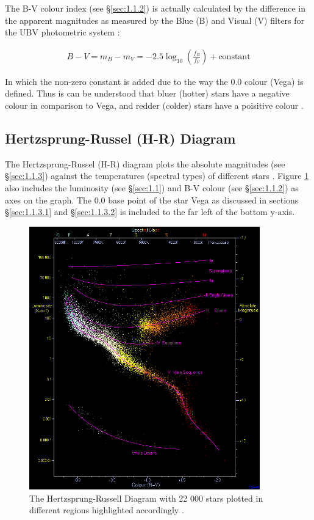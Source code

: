 \documentclass[12pt]{article}
\begin{document}
The B-V colour index (see §\ref{sec:1.1.2}) is actually calculated by the difference in the apparent magnitudes as measured by the Blue (B) and Visual (V) filters
for the UBV photometric system \cite{ccds}:

\vspace{-1.5ex}
\begin{gather} \label{eq:4}
    B-V = m_B - m_V = -2.5 \log_{10}\left( \frac{f_B}{f_V} \right) + \text{constant}
\end{gather}

In which the non-zero constant is added due to the way the 0.0 colour (Vega) is defined. Thus is can be understood that bluer (hotter) stars have a negative colour
in comparison to Vega, and redder (colder) stars have a poisitive colour
\cite{ccds}.

\subsection{Hertzsprung-Russel (H-R) Diagram} \label{sec:1.2}

The Hertzsprung-Russel (H-R) diagram plots the absolute magnitudes (see §\ref{sec:1.1.3}) against the temperatures (spectral types) of different stars \cite{brithr}.
Figure \ref{fig:hrdiagram} also includes the luminosity (see §\ref{sec:1.1}) and B-V colour (see §\ref{sec:1.1.2}) as axes on the graph.
The 0.0 base point of the star Vega as discussed in sections §\ref{sec:1.1.3.1} and §\ref{sec:1.1.3.2} is included to the far left of the bottom y-axis.

\begin{figure}[H]
    \centering
    \includegraphics[width=10cm]{HRDiagram.png}
    \caption{\centering The Hertzsprung-Russell Diagram with 22 000 stars plotted in different regions highlighted accordingly \protect\cite{wikihr}.}
    \label{fig:hrdiagram}
\end{figure}
\end{document}
